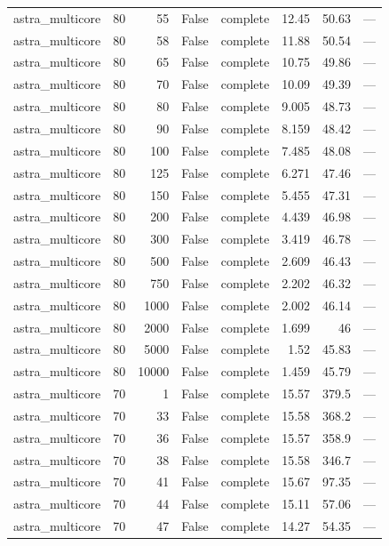 \begin{tabular}{lrrrlrrl}
astra\_multicore & 80 & 55 & False & complete & 12.45 & 50.63 & — \\
astra\_multicore & 80 & 58 & False & complete & 11.88 & 50.54 & — \\
astra\_multicore & 80 & 65 & False & complete & 10.75 & 49.86 & — \\
astra\_multicore & 80 & 70 & False & complete & 10.09 & 49.39 & — \\
astra\_multicore & 80 & 80 & False & complete & 9.005 & 48.73 & — \\
astra\_multicore & 80 & 90 & False & complete & 8.159 & 48.42 & — \\
astra\_multicore & 80 & 100 & False & complete & 7.485 & 48.08 & — \\
astra\_multicore & 80 & 125 & False & complete & 6.271 & 47.46 & — \\
astra\_multicore & 80 & 150 & False & complete & 5.455 & 47.31 & — \\
astra\_multicore & 80 & 200 & False & complete & 4.439 & 46.98 & — \\
astra\_multicore & 80 & 300 & False & complete & 3.419 & 46.78 & — \\
astra\_multicore & 80 & 500 & False & complete & 2.609 & 46.43 & — \\
astra\_multicore & 80 & 750 & False & complete & 2.202 & 46.32 & — \\
astra\_multicore & 80 & 1000 & False & complete & 2.002 & 46.14 & — \\
astra\_multicore & 80 & 2000 & False & complete & 1.699 & 46 & — \\
astra\_multicore & 80 & 5000 & False & complete & 1.52 & 45.83 & — \\
astra\_multicore & 80 & 10000 & False & complete & 1.459 & 45.79 & — \\
astra\_multicore & 70 & 1 & False & complete & 15.57 & 379.5 & — \\
astra\_multicore & 70 & 33 & False & complete & 15.58 & 368.2 & — \\
astra\_multicore & 70 & 36 & False & complete & 15.57 & 358.9 & — \\
astra\_multicore & 70 & 38 & False & complete & 15.58 & 346.7 & — \\
astra\_multicore & 70 & 41 & False & complete & 15.67 & 97.35 & — \\
astra\_multicore & 70 & 44 & False & complete & 15.11 & 57.06 & — \\
astra\_multicore & 70 & 47 & False & complete & 14.27 & 54.35 & — \\

\end{tabular}
